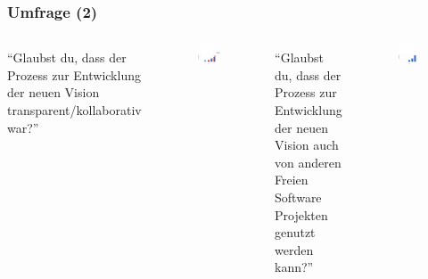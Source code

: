\documentclass{beamer}
\begin{document}
\begin{frame}
\frametitle{Umfrage (2)}
\begin{columns}
   ``Glaubst du, dass der Prozess zur Entwicklung der neuen Vision transparent/kollaborativ war?''\newline
   \begin{figure}[h!]
    \centering
    \includegraphics[scale=0.25,keepaspectratio=true]{./amarok1ef.png}
   \end{figure}
   ``Glaubst du, dass der Prozess zur Entwicklung der neuen Vision auch von anderen Freien Software Projekten genutzt werden kann?''
   \begin{figure}[h!]
    \centering
    \includegraphics[scale=0.25,keepaspectratio=true]{./amarok1d.png}
   \end{figure}
\end{columns}
\end{frame}
\end{document}
